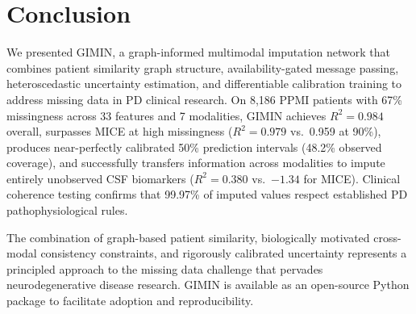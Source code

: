 \documentclass[journal,twoside,web]{ieeecolor}
\begin{document}
\section{Conclusion}
\label{sec:conclusion}

We presented GIMIN, a graph-informed multimodal imputation network that combines patient similarity graph structure, availability-gated message passing, heteroscedastic uncertainty estimation, and differentiable calibration training to address missing data in PD clinical research. On 8{,}186 PPMI patients with 67\% missingness across 33 features and 7 modalities, GIMIN achieves $R^2 = 0.984$ overall, surpasses MICE at high missingness ($R^2 = 0.979$ vs.\ 0.959 at 90\%), produces near-perfectly calibrated 50\% prediction intervals (48.2\% observed coverage), and successfully transfers information across modalities to impute entirely unobserved CSF biomarkers ($R^2 = 0.380$ vs.\ $-1.34$ for MICE). Clinical coherence testing confirms that 99.97\% of imputed values respect established PD pathophysiological rules.

The combination of graph-based patient similarity, biologically motivated cross-modal consistency constraints, and rigorously calibrated uncertainty represents a principled approach to the missing data challenge that pervades neurodegenerative disease research. GIMIN is available as an open-source Python package to facilitate adoption and reproducibility.
\end{document}
